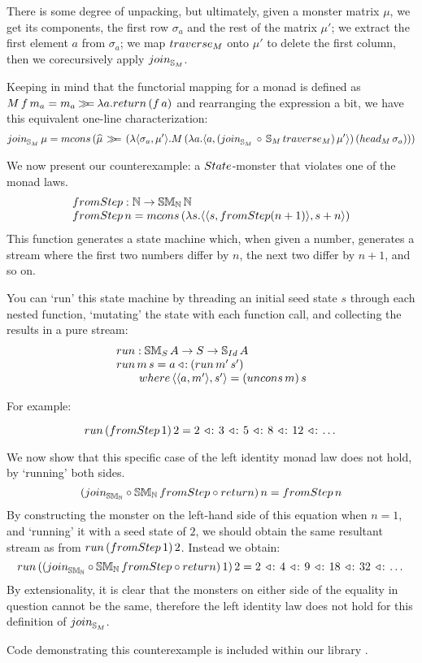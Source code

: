 There is some degree of unpacking, but ultimately, given a monster matrix $\mu$, we get its components, the first row $\sigma_a$ and the rest of the matrix $\mu'$; 
we extract the first element $a$ from $\sigma_a$;
we map $\traverse_M$ onto $\mu'$ to delete the first column, then we corecursively apply $\join_{\stream{M}}$.

Keeping in mind that the functorial mapping for a monad is defined as $M\,f\,m_a = m_a \bind \lambda a. \return\,(f\,a)$ and rearranging the expression a bit, we have this equivalent one-line characterization:
$$
\join_{\stream{M}}\, \mu = \mcons\, (\unc{\mu} \, \bind \,(\lambda \pair{\sigma_a}{\mu'} . M\,(\lambda a . \pair{a}{(\join_{\stream{M}}\, \comp\, \stream{M}\,\traverse_M)\, \mu'})\, (\head_M\, \sigma_a)))
$$

We now present our counterexample: a $\state$-monster that violates one of the monad laws.
$$
\begin{array}{l}
\fromstepstr : \nat \rightarrow \stmon{\nat}\,\nat \\
\fromstepstr\, n = \mcons\, (\lambda s. \pair{\pair{s}{\fromstepstr (n + 1)}}{s + n})
\end{array}
$$
This function generates a state machine which, when given a number, generates a stream where the first two numbers differ by $n$, the next two differ by $n + 1$, and so on.

You can `run' this state machine by threading an initial seed state $s$ through each nested function, `mutating' the state with each function call, and collecting the results in a pure stream:
$$
\begin{array}{l}
\strun : \stmon{S}\,A \rightarrow S \rightarrow \stream{\Id}\,A  \\
\strun\, m\, s = a \acons (\strun\,m'\,s')  \\
\qquad\where\,\pair{\pair{a}{m'}}{s'} = (\uncons\,m)\, s
\end{array}
$$

For example:

$$
\strun\,(\fromstepstr\, 1)\, 2 = 2\, \acons\, 3\, \acons\, 5\, \acons\, 8\, \acons\, 12\, \acons\, \dots
$$

We now show that this specific case of the left identity monad law does not hold, by `running' both sides.
$$
(\join_{\stmon{\nat}} \comp \stmon{\nat}\, \fromstepstr \comp \return)\, n = \fromstepstr\, n
$$
By constructing the monster on the left-hand side of this equation when $n = 1$, and `running' it with a seed state of $2$, we should obtain the same resultant stream as from $\strun\,(\fromstepstr\, 1)\, 2$. Instead we obtain:
$$
\strun\, ((\join_{\stmon{\nat}} \comp \stmon{\nat}\, \fromstepstr \comp \return)\, 1)\, 2 = 2\, \acons\, 4\, \acons\, 9\, \acons\, 18\, \acons\, 32\, \acons\, \dots
$$
By extensionality, it is clear that the monsters on either side of the equality in question cannot be the same, therefore the left identity law does not hold for this definition of $\join_{\stream{M}}$.

Code demonstrating this counterexample is included within our library . 




